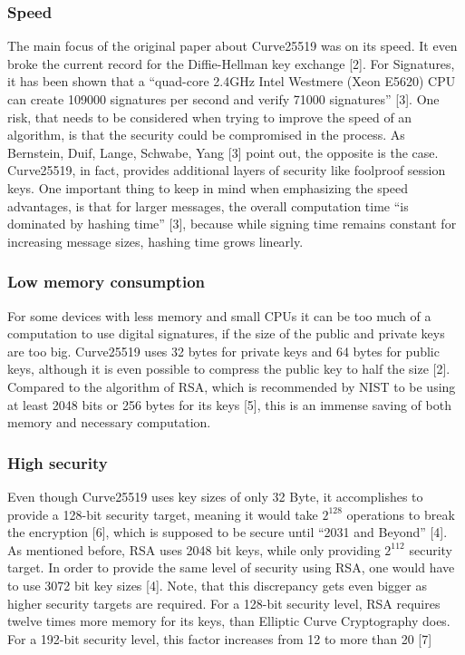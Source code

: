 \subsubsection{Speed}
The main focus of the original paper about Curve25519 was on its speed. It even broke the current record for the Diffie-Hellman key exchange [2]. For Signatures, it has been shown that a ``quad-core 2.4GHz Intel Westmere (Xeon E5620) CPU can create 109000 signatures per second and verify 71000 signatures'' [3]. One risk, that needs to be considered when trying to improve the speed of an algorithm, is that the security could be compromised in the process. As Bernstein, Duif, Lange, Schwabe, Yang [3] point out, the opposite is the case. Curve25519, in fact, provides additional layers of security like foolproof session keys. One important thing to keep in mind when emphasizing the speed advantages, is that for larger messages, the overall computation time “is dominated by hashing time” [3], because while signing time remains constant for increasing message sizes, hashing time grows linearly. 

\subsubsection{Low memory consumption}
For some devices with less memory and small CPUs it can be too much of a computation to use digital signatures, if the size of the public and private keys are too big. Curve25519 uses 32 bytes for private keys and 64 bytes for public keys, although it is even possible to compress the public key to half the size [2]. Compared to the algorithm of RSA, which is recommended by NIST to be using at least 2048 bits or 256 bytes for its keys [5], this is an immense saving of both memory and necessary computation.

\subsubsection{High security}
Even though Curve25519 uses key sizes of only 32 Byte, it accomplishes to provide a 128-bit security target, meaning it would take $ 2^{128} $ operations to break the encryption [6], which is supposed to be secure until “2031 and Beyond” [4]. As mentioned before, RSA uses 2048 bit keys, while only providing $ 2^{112} $ security target. In order to provide the same level of security using RSA, one would have to use 3072 bit key sizes [4]. Note, that this discrepancy gets even bigger as higher security targets are required. For a 128-bit security level, RSA requires twelve times more memory for its keys, than Elliptic Curve Cryptography does. For a 192-bit security level, this factor increases from 12 to more than 20 [7]

